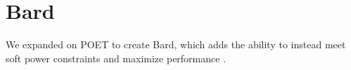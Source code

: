 \section{Bard}
\label{sec:poet-bard}

We expanded on POET to create Bard, which adds the ability to instead meet soft power constraints and maximize performance \cite{Bard}.
